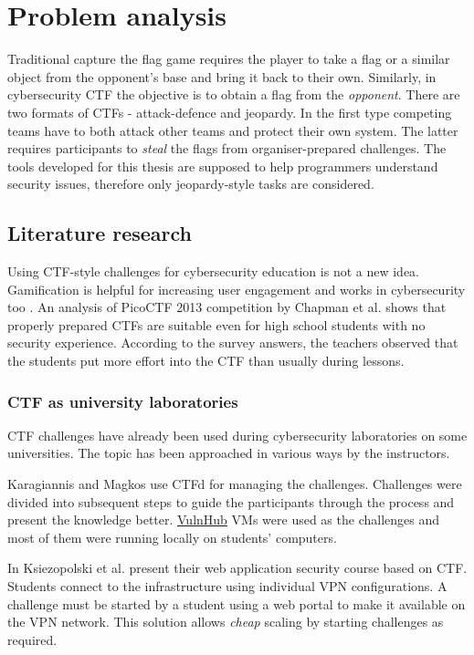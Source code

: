 \chapter{Problem analysis}
\label{chap:problem-analysis}

Traditional capture the flag game requires the player to take a flag or a similar object from the opponent's base and bring it back to their own. Similarly, in cybersecurity CTF the objective is to obtain a flag from the \textit{opponent}. There are two formats of CTFs - attack-defence and jeopardy. In the first type competing teams have to both attack other teams and protect their own system. The latter requires participants to \textit{steal} the flags from organiser-prepared challenges. The tools developed for this thesis are supposed to help programmers understand security issues, therefore only jeopardy-style tasks are considered.

\section{Literature research}

Using CTF-style challenges for cybersecurity education is not a new idea. Gamification is helpful for increasing user engagement and works in cybersecurity too \cite{bib:exploring-game-design}. An analysis of PicoCTF 2013 competition by Chapman et al. \cite{bib:picoCTF} shows that properly prepared CTFs are suitable even for high school students with no security experience. According to the survey answers, the teachers observed that the students put more effort into the CTF than usually during lessons.

\subsection{CTF as university laboratories}

CTF challenges have already been used during cybersecurity laboratories on some universities. The topic has been approached in various ways by the instructors.

Karagiannis and Magkos \cite{bib:Karagiannis2021} use CTFd for managing the challenges. Challenges were divided into subsequent steps to guide the participants through the process and present the knowledge better. \href{https://vulnhub.com/}{VulnHub} VMs were used as the challenges and most of them were running locally on students' computers.

In \cite{bib:teaching-ctf-PL} Ksiezopolski et al. present their web application security course based on CTF. Students connect to the infrastructure using individual VPN configurations. A challenge must be started by a student using a web portal to make it available on the VPN network. This solution allows \textit{cheap} scaling by starting challenges as required.

